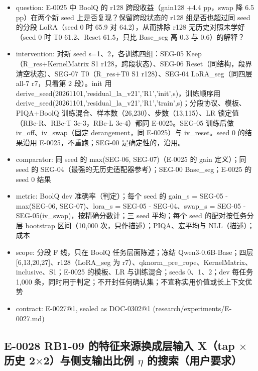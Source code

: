 \documentclass[11pt]{article}
\begin{document}
\begin{itemize}
\item question: E-0025 中 BoolQ 的 r128 跨段收益（gain128 +4.4 pp，swap 降 6.5 pp）在两个新 seed 上是否复现？保留跨段状态的 r128 组是否也超过同 seed 的分段 LoRA（seed 0 时 65.9 对 64.2），从而排除 r128 无历史对照未学好（seed 0 时 T0 61.2、Reset 61.5，只比 Base\_seg 高 0.3 与 0.6）的解释？
\item intervention: 对新 seed s=1、2，各训练四组：SEG-05 Keep（R\_res+KernelMatrix S1 r128，跨段状态）、SEG-06 Reset（同结构，段界清空状态）、SEG-07 T0（R\_res+T0 S1 r128）、SEG-04 LoRA\_seg（同四层 all-7 r7，只看第 2 段）。init 用 derive\_seed(20261101,'residual\_la\_v21','R1','init',s)，训练顺序用 derive\_seed(20261101,'residual\_la\_v21','R1','train',s)；分段协议、模板、PIQA+BoolQ 训练混合、样本数（26,230）、步数（13,115）、LR 锁定值（RBc-R、RBc-T 3e-3，RBc-L 3e-4）都同 E-0025。SEG-05 训练后做 iv\_off、iv\_swap（固定 derangement，同 E-0025）与 iv\_reset。seed 0 的结果沿用 E-0025，不重跑；SEG-00 是确定性的，沿用。
\item comparator: 同 seed 的 max(SEG-06, SEG-07)（E-0025 的 gain 定义）；同 seed 的 SEG-04（最强的无历史适配器参考）；SEG-00 Base\_seg；E-0025 的 seed 0 结果
\item metric: BoolQ dev 准确率（判定）；每个 seed 的 gain\_s = SEG-05 - max(SEG-06, SEG-07)、lora\_s = SEG-05 - SEG-04、swap\_s = SEG-05 - SEG-05(iv\_swap)，按精确分数计；三 seed 平均；每个 seed 的配对按任务分层 bootstrap 区间（10,000 次，只作描述）；PIQA、宏平均与 NLL（描述）；成本
\item scope: 分段 F 线，只在 BoolQ 任务层面陈述；冻结 Qwen3-0.6B-Base；四层 [6,13,20,27]、r128（LoRA\_seg 为 r7）、qknorm\_pre\_rope、KernelMatrix、inclusive、S1；E-0025 的模板、LR 与训练混合；seeds 0、1、2；dev 每任务 1,000 条，同时用于判定；不开封任何确认集；不宣称实用价值或长上下文优势
\item contract: E-0027@1, sealed as DOC-0302@1 (research/experiments/E-0027.md)
\end{itemize}

\subsection*{E-0028 RB1-09 的特征来源换成层输入 X（tap \ensuremath{\times} 历史 2\ensuremath{\times}2）与侧支输出比例 \ensuremath{\eta} 的搜索（用户要求）}
\end{document}
